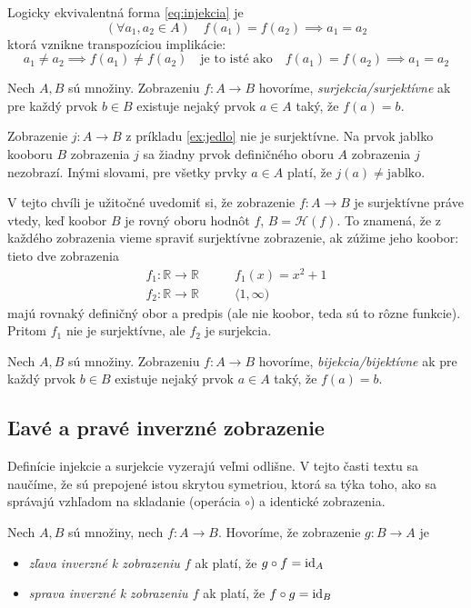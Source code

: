 Logicky ekvivalentná forma \eqref{eq:injekcia} je
\begin{equation}\label{eq:injekcia2}
(\forall a_1,a_2\in A)\quad f(a_1)=f(a_2)\implies a_1=a_2
\end{equation}
ktorá vznikne transpozíciou implikácie:
\[
a_1\neq a_2\implies f(a_1)\neq f(a_2)
\quad
\text{je to isté ako}
\quad
f(a_1)=f(a_2)\implies a_1=a_2
\]
\begin{definition}[surjekcia]\label{def:surjekcia}
Nech $A,B$ sú množiny. Zobrazeniu $f\colon A\to B$ hovoríme,
\emph{surjekcia/surjektívne} ak pre každý prvok $b\in B$ existuje nejaký prvok $a\in A$ taký, že
$f(a)=b$.
\end{definition}
\begin{example}
Zobrazenie $j\colon A\to B$ z príkladu \ref{ex:jedlo} nie je surjektívne. Na prvok jablko kooboru $B$
zobrazenia $j$ sa žiadny prvok definičného oboru $A$ zobrazenia $j$ nezobrazí. Inými slovami, pre všetky prvky $a\in A$
platí, že $j(a)\neq\text{jablko}$.
\end{example}
V tejto chvíli je užitočné uvedomiť si, že zobrazenie $f\colon A\to B$ je surjektívne práve vtedy, keď 
koobor $B$ je rovný oboru hodnôt $f$, $B=\mathcal H(f)$. To znamená, že z každého zobrazenia vieme spraviť surjektívne
zobrazenie, ak zúžime jeho koobor: tieto dve zobrazenia
\begin{align*}
f_1\colon\mathbb R\to \mathbb R&\qquad f_1(x)=x^2+1\\
f_2\colon\mathbb R\to \mathbb R&\qquad \langle 1,\infty)
\end{align*}
majú rovnaký definičný obor a predpis (ale nie koobor, teda sú to rôzne funkcie). Pritom $f_1$ nie je surjektívne, ale
$f_2$ je surjekcia. 
\begin{definition}[bijekcia]\label{def:bijekcia}
Nech $A,B$ sú množiny. Zobrazeniu $f\colon A\to B$ hovoríme,
\emph{bijekcia/bijektívne} ak pre každý prvok $b\in B$ existuje nejaký prvok $a\in A$ taký, že
$f(a)=b$.
\end{definition}
\subsection{Ľavé a pravé inverzné zobrazenie}

Definície injekcie a surjekcie vyzerajú veľmi odlišne. V tejto časti textu sa naučíme, že sú prepojené istou skrytou
symetriou, ktorá sa týka toho, ako sa správajú vzhľadom na skladanie (operácia $\circ$) a identické zobrazenia.

\begin{definition}\label{def:zlavaSpravaInverzne}
Nech $A,B$ sú množiny, nech $f\colon A\to B$. Hovoríme, že zobrazenie $g\colon B\to A$ je
\begin{itemize}
\item \emph{zľava inverzné k zobrazeniu $f$} ak platí, že $g\circ f=\mathrm{id}_A$
\item \emph{sprava inverzné k zobrazeniu $f$} ak platí, že $f\circ g=\mathrm{id}_B$
\end{itemize}
\end{definition}

